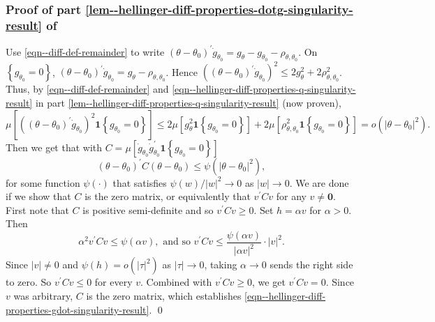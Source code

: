 \subsubsection{Proof of part
\ref{lem--hellinger-diff-properties-dotg-singularity-result}
of }

Use \eqref{eqn--diff-def-remainder} to write
\((\theta - \theta_{0})^{\prime} \dot{g}_{\theta_{0}} = g_{\theta} -
g_{\theta_{0}} - \rho_{\theta, \theta_{0}}\).
On \(\left\{ g_{\theta_{0}} = 0 \right\}\), \((\theta - \theta_{0})^{\prime}
\dot{g}_{\theta_{0}} = g_{\theta} - \rho_{\theta, \theta_{0}}\).
Hence \(\left( (\theta - \theta_{0})^{\prime} \dot{g}_{\theta_{0}} \right)^{2}
\leq 2 g_{\theta}^{2} + 2 \rho_{\theta, \theta_{0}}^{2}\).
Thus, by \eqref{eqn--diff-def-remainder} and
\eqref{eqn--hellinger-diff-properties-q-singularity-result} in part
\ref{lem--hellinger-diff-properties-q-singularity-result} (now proven),
\begin{equation*}
  \mu \left[ \left( (\theta - \theta_{0})^{\prime} \dot{g}_{\theta_{0}}
  \right)^{2} \mathbf{1} \left\{ g_{\theta_{0}} = 0 \right\} \right] \leq 2 \mu
  \left[ g_{\theta}^{2} \mathbf{1} \left\{ g_{\theta_{0}} = 0 \right\} \right] +
  2 \mu \left[ \rho_{\theta, \theta_{0}}^{2} \mathbf{1} \left\{ g_{\theta_{0}} =
  0 \right\} \right] = o \left( |\theta - \theta_{0}|^{2} \right).
\end{equation*}
Then we get that with \(C = \mu \left[ \dot{g}_{\theta_{0}}
\dot{g}_{\theta_{0}}^{\prime} \mathbf{1} \left\{ g_{\theta_{0}} = 0 \right\}
\right]\)
\begin{equation*}
  (\theta - \theta_{0})^{\prime} C (\theta - \theta_{0}) \leq \psi \left(
  |\theta - \theta_{0}|^{2} \right),
\end{equation*}
for some function \(\psi (\cdot)\) that satisfies \(\psi (w) / |w|^{2} \to 0\)
as \(|w| \to 0\).
We are done if we show that \(C\) is the zero matrix, or equivalently that
\(v^{\prime} C v\) for any \(v \neq \mathbf{0}\).
First note that \(C\) is positive semi-definite and so \(v^{\prime} C v \geq
0\).
Set \(h = \alpha v\) for \(\alpha > 0\).
Then
\begin{equation*}
  \alpha^{2} v^{\prime} C v \leq \psi(\alpha v), \text{ and so }
  v^{\prime} C v \leq \frac{\psi(\alpha v)}{|\alpha v|^{2}} \cdot |v|^{2}.
\end{equation*}
Since \(|v| \neq 0\) and \(\psi(h) = o(|\tau|^{2})\) as \(|\tau| \to 0\), taking
\(\alpha \to 0\) sends the right side to zero.
So \(v^{\prime}Cv \leq 0\) for every \(v\).
Combined with \(v^{\prime} C v \geq 0\), we get \(v^{\prime} C v = 0\).
Since \(v\) was arbitrary, \(C\) is the zero matrix, which establishes
\eqref{eqn--hellinger-diff-properties-gdot-singularity-result}.
\qed

